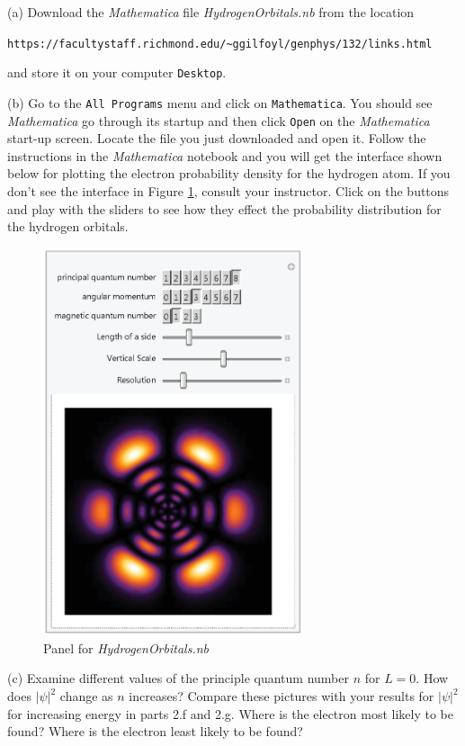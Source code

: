 (a) Download the {\it Mathematica} file {\it HydrogenOrbitals.nb} from the location \\
\begin{center}
{\verb!https://facultystaff.richmond.edu/~ggilfoyl/genphys/132/links.html!}
\end{center}
\noindent and store it on your computer {\tt Desktop}.

(b) Go to the {\tt All Programs} menu and click on {\tt Mathematica}.
You should see {\it Mathematica} go through its startup and then click {\tt Open}
on the {\it Mathematica} start-up screen.
Locate the file you just downloaded and open it.
Follow the instructions in the {\it Mathematica} notebook
and you will get the interface shown below for plotting
the electron probability density for the hydrogen atom.
If you don't see the interface in Figure \ref{fig:gui}, consult your instructor.
Click on the buttons and play with the sliders to see how they effect the 
probability distribution for the hydrogen orbitals.
\begin{figure}[h!]
\begin{center}
\includegraphics[width=3.0in]{qmProbability/HydrogenOrbitals132.eps}
\caption{Panel for {\it HydrogenOrbitals.nb}}\label{fig:gui}
\end{center}
\end{figure}

(c) Examine different values of the principle quantum number $n$ for $L=0$.
How does $|\psi|^2$ change as $n$ increases? Compare these pictures with your results for 
$|\psi|^2$ for increasing energy in parts 2.f and 2.g.
Where is the electron most likely to be found?
Where is the electron least likely to be found?
\vspace{3.0cm}


